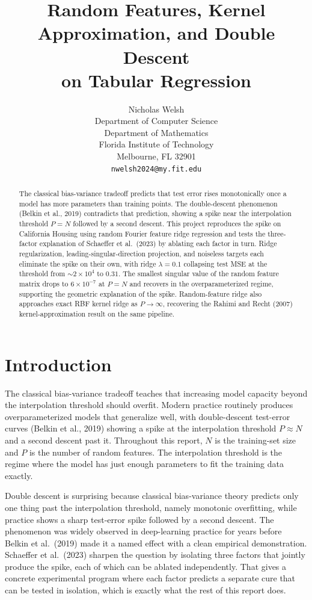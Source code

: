 \documentclass{article}
\title{Random Features, Kernel Approximation, and Double Descent\\on Tabular Regression}
\author{%
 Nicholas Welsh \\
  Department of Computer Science\\
  Department of Mathematics \\
  Florida Institute of Technology\\
  Melbourne, FL 32901 \\
  \texttt{nwelsh2024@my.fit.edu}
}
\begin{document}
\maketitle

\begin{abstract}
The classical bias-variance tradeoff predicts that test error rises monotonically once a model has more parameters than training points. The double-descent phenomenon (Belkin et al., 2019) contradicts that prediction, showing a spike near the interpolation threshold $P = N$ followed by a second descent. This project reproduces the spike on California Housing using random Fourier feature ridge regression and tests the three-factor explanation of Schaeffer et al.\ (2023) by ablating each factor in turn. Ridge regularization, leading-singular-direction projection, and noiseless targets each eliminate the spike on their own, with ridge $\lambda = 0.1$ collapsing test MSE at the threshold from $\sim 2 \times 10^4$ to $0.31$. The smallest singular value of the random feature matrix drops to $6 \times 10^{-7}$ at $P = N$ and recovers in the overparameterized regime, supporting the geometric explanation of the spike. Random-feature ridge also approaches exact RBF kernel ridge as $P \to \infty$, recovering the Rahimi and Recht (2007) kernel-approximation result on the same pipeline.
\end{abstract}

\section{Introduction}

The classical bias-variance tradeoff teaches that increasing model capacity beyond the interpolation threshold should overfit. Modern practice routinely produces overparameterized models that generalize well, with double-descent test-error curves (Belkin et al., 2019) showing a spike at the interpolation threshold $P \approx N$ and a second descent past it. Throughout this report, $N$ is the training-set size and $P$ is the number of random features. The interpolation threshold is the regime where the model has just enough parameters to fit the training data exactly.

Double descent is surprising because classical bias-variance theory predicts only one thing past the interpolation threshold, namely monotonic overfitting, while practice shows a sharp test-error spike followed by a second descent. The phenomenon was widely observed in deep-learning practice for years before Belkin et al.\ (2019) made it a named effect with a clean empirical demonstration. Schaeffer et al.\ (2023) sharpen the question by isolating three factors that jointly produce the spike, each of which can be ablated independently. That gives a concrete experimental program where each factor predicts a separate cure that can be tested in isolation, which is exactly what the rest of this report does.
\end{document}
